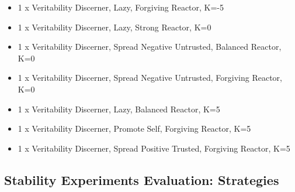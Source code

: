 \documentclass[]{final_report}
\begin{document}
\begin{itemize}
	\item 1 x Veritability Discerner, Lazy, Forgiving Reactor, K=-5
	\item 1 x Veritability Discerner, Lazy, Strong Reactor, K=0
	\item 1 x Veritability Discerner, Spread Negative Untrusted, Balanced Reactor, K=0
	\item 1 x Veritability Discerner, Spread Negative Untrusted, Forgiving Reactor, K=0
	\item 1 x Veritability Discerner, Lazy, Balanced Reactor, K=5
	\item 1 x Veritability Discerner, Promote Self, Forgiving Reactor, K=5
	\item 1 x Veritability Discerner, Spread Positive Trusted, Forgiving Reactor, K=5
\end{itemize}

\subsection{Stability Experiments Evaluation: Strategies}
\label{appendix:stab_strat_experiments}
\end{document}
